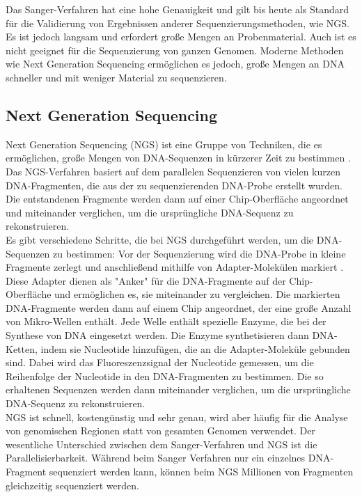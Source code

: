 \documentclass[oneside,bibliography=totocnumbered,BCOR=5mm]{scrbook}%
\theoremstyle{definition}
\theoremstyle{definition}
\theoremstyle{definition}
\theoremstyle{definition}
\theoremstyle{definition}
\theoremstyle{definition}
\begin{document}
Das Sanger-Verfahren hat eine hohe Genauigkeit und gilt bis heute als Standard für die Validierung von 
Ergebnissen anderer Sequenzierungsmethoden, wie NGS. 
Es ist jedoch langsam und erfordert große Mengen an Probenmaterial. 
Auch ist es nicht geeignet für die Sequenzierung von ganzen Genomen. 
Moderne Methoden wie Next Generation Sequencing ermöglichen es jedoch, große Mengen an DNA schneller und mit weniger Material zu sequenzieren. \\


\subsection{Next Generation Sequencing}
Next Generation Sequencing (NGS) ist eine Gruppe von Techniken, die es ermöglichen, große Mengen 
von DNA-Sequenzen in kürzerer Zeit zu bestimmen \autocite[Seite 278]{NGS}. 
Das NGS-Verfahren basiert auf dem parallelen Sequenzieren von vielen kurzen DNA-Fragmenten, 
die aus der zu sequenzierenden DNA-Probe erstellt wurden. 
Die entstandenen Fragmente werden dann auf einer Chip-Oberfläche angeordnet und miteinander verglichen, 
um die ursprüngliche DNA-Sequenz zu rekonstruieren. \\


Es gibt verschiedene Schritte, die bei NGS durchgeführt werden, um die DNA-Sequenzen zu bestimmen: 
Vor der Sequenzierung wird die DNA-Probe in kleine Fragmente zerlegt und anschließend mithilfe von 
Adapter-Molekülen markiert \autocite[Seite 279]{NGS}.
Diese Adapter dienen als "Anker" für die DNA-Fragmente auf der Chip-Oberfläche und ermöglichen es, 
sie miteinander zu vergleichen.  
Die markierten DNA-Fragmente werden dann auf einem Chip angeordnet, 
der eine große Anzahl von Mikro-Wellen enthält. 
Jede Welle enthält spezielle Enzyme, die bei der Synthese von DNA eingesetzt werden. 
Die Enzyme synthetisieren dann DNA-Ketten, indem sie Nucleotide hinzufügen, 
die an die Adapter-Moleküle gebunden sind. Dabei wird das Fluoreszenzsignal der Nucleotide gemessen, 
um die Reihenfolge der Nucleotide in den DNA-Fragmenten zu bestimmen.
Die so erhaltenen Sequenzen werden dann miteinander verglichen, um die ursprüngliche DNA-Sequenz zu rekonstruieren. \\


NGS ist schnell, kostengünstig und sehr genau, 
wird aber häufig für die Analyse von genomischen Regionen statt von gesamten Genomen verwendet.
Der wesentliche Unterschied zwischen dem Sanger-Verfahren und NGS ist die Parallelisierbarkeit. 
Während beim Sanger Verfahren nur ein einzelnes DNA-Fragment sequenziert werden kann, 
können beim NGS Millionen von Fragmenten gleichzeitig sequenziert werden.  \\
\end{document}

